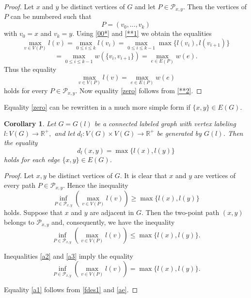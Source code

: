 \documentclass[pdflatex,sn-mathphys-num]{sn-jnl}%
\theoremstyle{thmstyleone}%
\newtheorem{Corollary}[Theorem]{Corollary}
\theoremstyle{thmstyletwo}%
\theoremstyle{thmstylethree}%
\theoremstyle{thmstyletwo}%
\theoremstyle{thmstylethree}%
\begin{document}
\begin{proof}
Let $x$ and $y$ be distinct vertices of $G$ and let $P \in \mathcal{P}_{x,y}$. Then the vertices of $P$ can be numbered such that
\begin{equation}
    \label{**1}
P=(v_0,\dots,v_k)
\end{equation}
with $v_0=x$ and $v_k=y$.
Using \eqref{00*} and \eqref{**1} we obtain the equalities
\[
\max_{v \in V(P)} l(v)
=
\max_{0 \le i \le k} l(v_i)
=
\max_{0 \le i \le k-1} \max\{l(v_i), l(v_{i+1})\}
\]
\[
=
\max_{0 \le i \le k-1} w(\{v_i,v_{i+1}\})
=
\max_{e \in E(P)} w(e).
\]
Thus the equality
\begin{equation}
    \label{**2}
\max_{v \in V(P)} l(v) = \max_{e \in E(P)} w(e)
\end{equation}
holds for every $P \in \mathcal{P}_{x,y}$. Now equality \eqref{zero} follows from \eqref{**2}. 
\end{proof}




Equality \eqref{zero} can be rewritten in a much more simple form if $\{x,y\} \in E(G)$.

\begin{Corollary}\label{btoy} Let $G = G(l)$ be a connected labeled graph with  vertex labeling $l : V(G) \to \mathbb R^+,$ and let $d_l : V(G)\times V(G)\to \mathbb R^+$ be generated by $G(l)$. Then the equality
\begin{equation}
    \label{a1}
d_l(x,y)
= \max \{ l(x), l(y) \}
\end{equation}
holds for each edge $ \{x,y\} \in E(G)$.
\end{Corollary}

\begin{proof}
Let $x,y$  be distinct vertices of $G$.
It is clear that $x$  and $ y$  are vertices of every path $ P \in \mathcal{P}_{x,y}$.
Hence the inequality
\begin{equation}
    \label{a2}
\inf_{P \in \mathcal{P}_{x,y}} \left( \max_{v \in V(P)} l(v) \right)
\ge \max \{ l(x), l(y) \}
\end{equation}
holds.
Suppose that $x$ and $y$ are adjacent in $G$. Then the two-point path $(x,y)$ belongs to $\mathcal{P}_{x,y}$ and, consequently, we have the inequality
\begin{equation}
    \label{a3}
\inf_{P \in \mathcal{P}_{x,y}} \left( \max_{v \in V(P)} l(v) \right)
\le \max \{ l(x), l(y) \}.
\end{equation}








Inequalities  \eqref{a2} and \eqref{a3} imply the equality
\begin{equation}
    \label{ae}
\inf_{P \in \mathcal{P}_{x,y}} \left( \max_{v \in V(P)} l(v) \right)
= \max \{ l(x), l(y) \}.
\end{equation}

Equality \eqref{a1} follows from \eqref{fdes1} and \eqref{ae}.
\end{proof}
\end{document}
